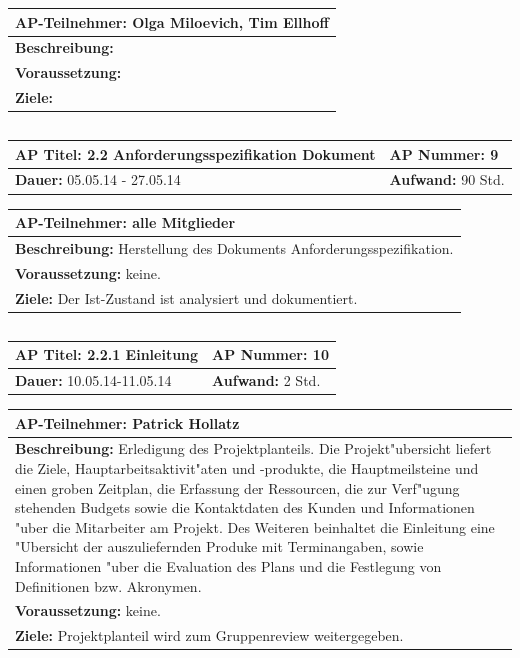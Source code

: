 \documentclass[fontsize=12pt,paper=a4,twoside]{scrartcl}
\begin{document}
\begin{tabular}{|p{15.3cm}|}
\hline
\textbf{AP-Teilnehmer: }Olga Miloevich, Tim Ellhoff\\
\hline
\textbf{Beschreibung: } \\
\hline
\textbf{Voraussetzung: }\\
\hline 
\textbf{Ziele: }\\
\hline 
\end{tabular}
\begin{verbatim}

\end{verbatim}
\begin{tabular}{|p{7.43cm}|p{7.43cm}|}
\hline
\textbf{AP Titel: }2.2 Anforderungsspezifikation Dokument & \textbf{AP Nummer: }9\\ 
\hline
\textbf{Dauer: }05.05.14 - 27.05.14 & \textbf{Aufwand: }90 Std.\\
\hline
\end{tabular}
\begin{tabular}{|p{15.3cm}|}
\hline
\textbf{AP-Teilnehmer: }alle Mitglieder\\
\hline
\textbf{Beschreibung: } Herstellung des Dokuments Anforderungsspezifikation.\\
\hline
\textbf{Voraussetzung: }keine. \\
\hline 
\textbf{Ziele: }Der Ist-Zustand ist analysiert und dokumentiert.\\
\hline 
\end{tabular}
\begin{verbatim}

\end{verbatim}
\begin{tabular}{|p{7.43cm}|p{7.43cm}|}
\hline
\textbf{AP Titel: }2.2.1 Einleitung & \textbf{AP Nummer: }10\\ 
\hline
\textbf{Dauer: }10.05.14-11.05.14 & \textbf{Aufwand: }2 Std.\\
\hline
\end{tabular}
\begin{tabular}{|p{15.3cm}|}
\hline
\textbf{AP-Teilnehmer: }Patrick Hollatz\\
\hline
\textbf{Beschreibung: }Erledigung des Projektplanteils. Die Projekt"ubersicht liefert die Ziele, Hauptarbeitsaktivit"aten und -produkte, die Hauptmeilsteine und einen groben Zeitplan, die Erfassung der Ressourcen, die zur Verf"ugung stehenden Budgets sowie die Kontaktdaten des Kunden und Informationen "uber die Mitarbeiter am Projekt. Des Weiteren beinhaltet die Einleitung eine "Ubersicht der auszuliefernden Produke mit Terminangaben, sowie Informationen "uber die Evaluation des Plans und die Festlegung von Definitionen bzw. Akronymen.\\
\hline
\textbf{Voraussetzung: }keine.\\
\hline 
\textbf{Ziele: }Projektplanteil wird zum Gruppenreview weitergegeben.\\
\hline 
\end{tabular}
\end{document}

